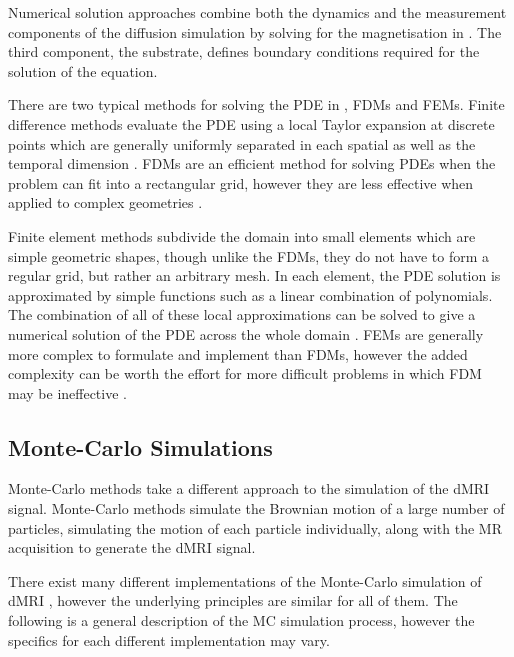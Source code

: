 Numerical solution approaches combine both the dynamics and the measurement components of the diffusion simulation by solving for the magnetisation in  .
The third component, the substrate, defines boundary conditions required for the solution of the equation. 

There are two typical methods for solving the \ac{PDE} in , \acp{FDM} and \acp{FEM}.
Finite difference methods evaluate the \ac{PDE} using a local Taylor expansion at discrete points which are generally uniformly separated in each spatial as well as the temporal dimension \cite{Grossmann2007}.
\acp{FDM} are an efficient method for solving \acp{PDE} when the problem can fit into a rectangular grid, however they are less effective when applied to complex geometries \cite{Hagslatt2003, Grossmann2007}.

Finite element methods subdivide the domain into small elements which are simple geometric shapes, though unlike the \acp{FDM}, they do not have to form a regular grid, but rather an arbitrary mesh.
In each element, the \ac{PDE} solution is approximated by simple functions such as a linear combination of polynomials.
The combination of all of these local approximations can be solved to give a numerical solution of the \ac{PDE} across the whole domain \cite{Logan2007}.
\acp{FEM} are generally more complex to formulate and implement than \acp{FDM}, however the added complexity can be worth the effort for more difficult problems in which \ac{FDM} may be ineffective \cite{Iserles2009}.

\subsection{Monte-Carlo Simulations}
\label{sec:montecarlo}
Monte-Carlo methods take a different approach to the simulation of the \ac{dMRI} signal. Monte-Carlo methods simulate the Brownian motion of a large number of particles, simulating the motion of each particle individually, along with the MR acquisition to generate the \ac{dMRI} signal.

There exist many different implementations of the Monte-Carlo simulation of \ac{dMRI} \cite{Yeh2013,Nilsson2012,Landman2010,Balls2009,Hall2009,Ford1997,Szafer1995}, however the underlying principles are similar for all of them. The following is a general description of the \ac{MC} simulation process, however the specifics for each different implementation may vary. 



